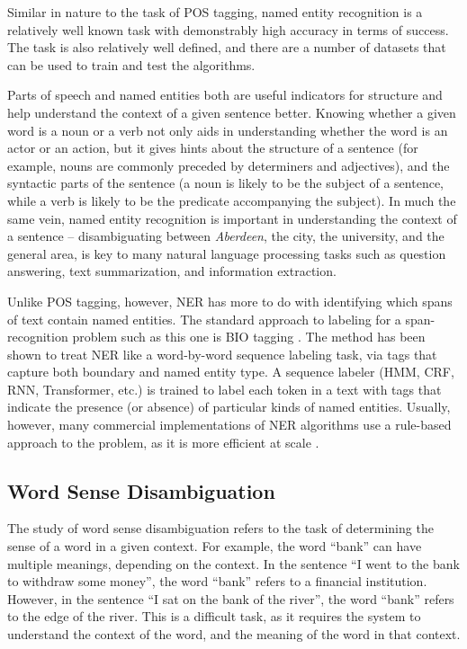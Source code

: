 Similar in nature to the task of POS tagging, named entity recognition is a relatively well known task with demonstrably high accuracy in terms of success. The task is also relatively well defined, and there are a number of datasets that can be used to train and test the algorithms.

Parts of speech and named entities both are useful indicators for structure and help understand the context of a given sentence better. Knowing whether a given word is a noun or a verb not only aids in understanding whether the word is an actor or an action, but it gives hints about the structure of a sentence (for example, nouns are commonly preceded by determiners and adjectives), and the syntactic parts of the sentence (a noun is likely to be the subject of a sentence, while a verb is likely to be the predicate accompanying the subject). In much the same vein, named entity recognition is important in understanding the context of a sentence -- disambiguating between \textit{Aberdeen}, the city, the university, and the general area, is key to many natural language processing tasks such as question answering, text summarization, and information extraction.

Unlike POS tagging, however, NER has more to do with identifying which spans of text contain named entities. The standard approach to labeling for a span-recognition problem such as this one is BIO tagging \cite{ramshaw-marcus-1995-text-ner}. The method has been shown to treat NER like a word-by-word sequence labeling task, via tags that capture both boundary and named entity type. A sequence labeler (HMM, CRF, RNN, Transformer, etc.) is trained to label each token in a text with tags that indicate the presence (or absence) of particular kinds of named entities. Usually, however, many commercial implementations of NER algorithms use a rule-based approach to the problem, as it is more efficient at scale \citep{li-etal-2011-systemt-ner}. 


\subsection{Word Sense Disambiguation}

The study of word sense disambiguation refers to the task of determining the sense of a word in a given context. For example, the word ``bank'' can have multiple meanings, depending on the context. In the sentence ``I went to the bank to withdraw some money'', the word ``bank'' refers to a financial institution. However, in the sentence ``I sat on the bank of the river'', the word ``bank'' refers to the edge of the river. This is a difficult task, as it requires the system to understand the context of the word, and the meaning of the word in that context.

